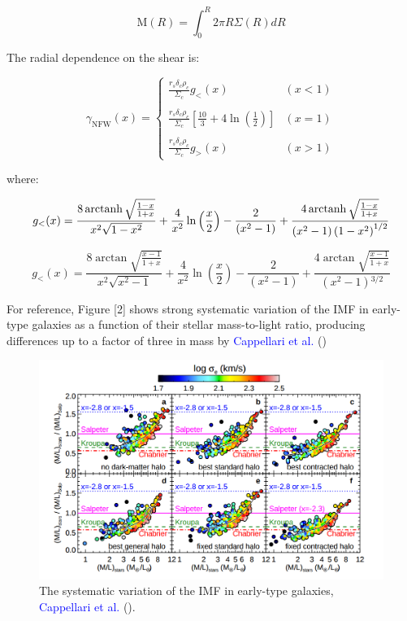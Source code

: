 \begin{appendices}
\begin{equation}
\text{M}(R)=\int_{0}^{R}2\pi R\Sigma(R)dR
\end{equation}

The radial dependence on the shear is:

\begin{equation}
\gamma_{\text{NFW}}(x) = \left\lbrace
\begin{array}{lll}
\frac{r_{s}\delta_{c}\rho_{c}}{\Sigma_c}g_{<}(x) & (x<1)\\\\
\frac{r_{s}\delta_{c}\rho_{c}}{\Sigma_c}\left[\frac{10}{3}+4 \ln \left(\frac{1}{2}\right)\right] & (x=1)\\\\
\frac{r_{s}\delta_{c}\rho_{c}}{\Sigma_c}g_{>}(x) & (x>1)
\end{array}
\right.
\end{equation} 

where: 

\begin{equation}
g_{<}(x)=\frac{8 \operatorname{arctanh} \sqrt{\frac{1-x}{1+x}}}{x^{2}\sqrt{1-x^{2}}}+\frac{4}{x^{2}} \ln \left(\frac{x}{2}\right)-\frac{2}{\left(x^{2}-1\right)}+\frac{4 \operatorname{arctanh} \sqrt{\frac{1-x}{1+x}}}{\left(x^{2}-1\right)\left(1-x^{2}\right)^{1/2}}
\end{equation}

\begin{equation}
g_{<}(x)=\frac{8 \arctan \sqrt{\frac{x-1}{1+x}}}{x^{2}\sqrt{x^{2}-1}}+\frac{4}{x^{2}}\ln \left(\frac{x}{2}\right)-\frac{2}{\left(x^{2}-1\right)}+\frac{4 \arctan \sqrt{\frac{x-1}{1+x}}}{\left(x^{2}-1\right){}^{3/2}}
\end{equation}  

For reference, Figure [2] shows strong systematic variation of the IMF in early-type galaxies as a function of their stellar mass-to-light ratio, producing differences up to a factor of three in mass by \textcolor{blue}{Cappellari et al.} (\citeyear{Reference19})

\begin{figure}[H]
\centering
\includegraphics[width=12cm]{images/IMFs_paper.png}
\caption[The systematic variation of the IMF in early-type galaxies.]{The systematic variation of the IMF in early-type galaxies, \textcolor{blue}{Cappellari et al.} (\citeyear{Reference19}).}
\end{figure}
 
\end{appendices}